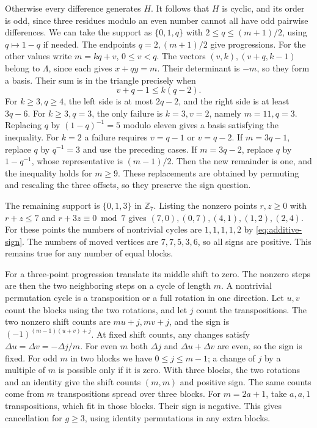 \documentclass[11pt,reqno]{amsart}
\theoremstyle{remark}
\numberwithin{equation}{section}
\begin{document}
Otherwise every difference generates \(H\). It follows that \(H\) is
cyclic, and its order is odd, since three residues modulo an even number
cannot all have odd pairwise differences. We can take the support as
\(\{0,1,q\}\) with \(2\le q\le(m+1)/2\), using \(q\mapsto1-q\) if needed.
The endpoints \(q=2,(m+1)/2\) give progressions. For the other values
write \(m=kq+v\), \(0\le v<q\). The vectors \((v,k),(v+q,k-1)\) belong to
\(\Lambda\), since each gives \(x+qy=m\). Their determinant is \(-m\), so
they form a basis. Their sum is in the triangle precisely when
\[
 v+q-1\le k(q-2).
\]
For \(k\ge3,q\ge4\), the left side is at most \(2q-2\), and the right
side is at least \(3q-6\). For \(k\ge3,q=3\), the only failure is
\(k=3,v=2\), namely \(m=11,q=3\). Replacing \(q\) by \((1-q)^{-1}=5\)
modulo eleven gives a basis satisfying the inequality. For \(k=2\) a
failure requires \(v=q-1\) or \(v=q-2\). If \(m=3q-1\), replace \(q\) by
\(q^{-1}=3\) and use the preceding cases. If \(m=3q-2\), replace \(q\) by
\(1-q^{-1}\), whose representative is \((m-1)/2\). Then the new remainder
is one, and the inequality holds for \(m\ge9\). These replacements are
obtained by permuting and rescaling the three offsets, so they preserve
the sign question.

The remaining support is \(\{0,1,3\}\) in \(\mathbb Z_7\). Listing the
nonzero points \(r,z\ge0\) with \(r+z\le7\) and \(r+3z\equiv0\bmod7\)
gives \((7,0),(0,7),(4,1),(1,2),(2,4)\). For these points the numbers of
nontrivial cycles are \(1,1,1,1,2\) by \eqref{eq:additive-sign}. The
numbers of moved vertices are \(7,7,5,3,6\), so all signs are positive.
This remains true for any number of equal blocks.

For a three-point progression translate its middle shift to zero. The
nonzero steps are then the two neighboring steps on a cycle of length
\(m\). A nontrivial permutation cycle is a transposition or a full
rotation in one direction. Let \(u,v\) count the blocks using the two
rotations, and let \(j\) count the transpositions. The two nonzero shift
counts are \(mu+j,mv+j\), and the sign is \((-1)^{(m-1)(u+v)+j}\). At
fixed shift counts, any changes satisfy \(\Delta u=\Delta v=-\Delta
j/m\). For even \(m\) both \(\Delta j\) and \(\Delta u+\Delta v\) are
even, so the sign is fixed. For odd \(m\) in two blocks we have \(0\le
j\le m-1\); a change of \(j\) by a multiple of \(m\) is possible only if
it is zero. With three blocks, the two rotations and an identity give the
shift counts \((m,m)\) and positive sign. The same counts come from \(m\)
transpositions spread over three blocks. For \(m=2a+1\), take \(a,a,1\)
transpositions, which fit in those blocks. Their sign is negative. This
gives cancellation for \(g\ge3\), using identity permutations in any
extra blocks.
\end{document}
